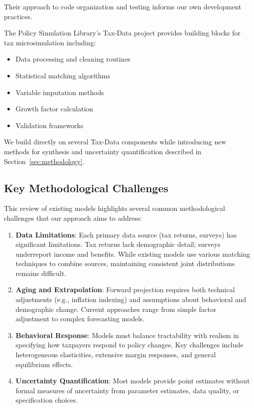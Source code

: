 Their approach to code organization and testing informs our own development practices.

The Policy Simulation Library's Tax-Data project \citep{psl2024} provides building blocks for tax microsimulation including:

\begin{itemize}
    \item Data processing and cleaning routines
    \item Statistical matching algorithms
    \item Variable imputation methods
    \item Growth factor calculation
    \item Validation frameworks
\end{itemize}

We build directly on several Tax-Data components while introducing new methods for synthesis and uncertainty quantification described in Section~\ref{sec:methodology}.

\subsection{Key Methodological Challenges}

This review of existing models highlights several common methodological challenges that our approach aims to address:

\begin{enumerate}
    \item \textbf{Data Limitations}: Each primary data source (tax returns, surveys) has significant limitations. Tax returns lack demographic detail; surveys underreport income and benefits. While existing models use various matching techniques to combine sources, maintaining consistent joint distributions remains difficult.
    
    \item \textbf{Aging and Extrapolation}: Forward projection requires both technical adjustments (e.g., inflation indexing) and assumptions about behavioral and demographic change. Current approaches range from simple factor adjustment to complex forecasting models.
    
    \item \textbf{Behavioral Response}: Models must balance tractability with realism in specifying how taxpayers respond to policy changes. Key challenges include heterogeneous elasticities, extensive margin responses, and general equilibrium effects.
    
    \item \textbf{Uncertainty Quantification}: Most models provide point estimates without formal measures of uncertainty from parameter estimates, data quality, or specification choices.
\end{enumerate}

